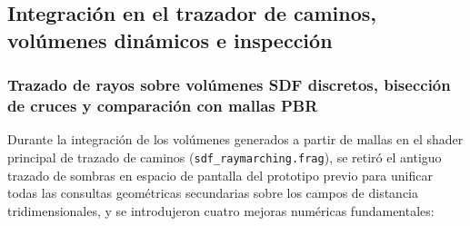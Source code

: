\subsection{Integración en el trazador de caminos, volúmenes dinámicos e inspección}

\subsubsection{Trazado de rayos sobre volúmenes SDF discretos, bisección de cruces y comparación con mallas PBR}

Durante la integración de los volúmenes generados a partir de mallas en el shader principal de trazado de caminos (\texttt{sdf\_raymarching.frag}), se retiró el antiguo trazado de sombras en espacio de pantalla del prototipo previo para unificar todas las consultas geométricas secundarias sobre los campos de distancia tridimensionales, y se introdujeron cuatro mejoras numéricas fundamentales:

